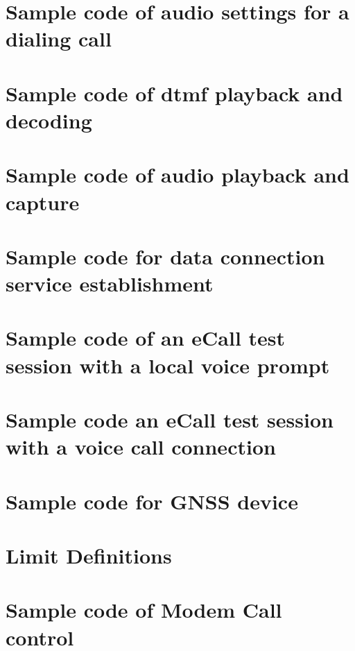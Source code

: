 \documentclass[twoside]{book}
\newcommand{\+}{\discretionary{\mbox{\scriptsize$\hookleftarrow$}}{}{}}
\begin{document}
\chapter{Sample code of audio settings for a dialing call}
\label{c_audioMcc}
\hypertarget{c_audioMcc}{}

\chapter{Sample code of dtmf playback and decoding}
\label{c_audiodtmf}
\hypertarget{c_audiodtmf}{}

\chapter{Sample code of audio playback and capture}
\label{c_audioCapturePlayback}
\hypertarget{c_audioCapturePlayback}{}

\chapter{Sample code for data connection service establishment}
\label{c_dataConnectionServiceSample}
\hypertarget{c_dataConnectionServiceSample}{}

\chapter{Sample code of an e\+Call test session with a local voice prompt}
\label{c_ecallWPromptSample}
\hypertarget{c_ecallWPromptSample}{}

\chapter{Sample code an e\+Call test session with a voice call connection}
\label{c_ecallWVoiceSample}
\hypertarget{c_ecallWVoiceSample}{}

\chapter{Sample code for G\+N\+SS device}
\label{c_gnssSampleCode}
\hypertarget{c_gnssSampleCode}{}

\chapter{Limit Definitions}
\label{c_limit}
\hypertarget{c_limit}{}

\chapter{Sample code of Modem Call control}
\label{c_mccTest}
\hypertarget{c_mccTest}{}

\end{document}
